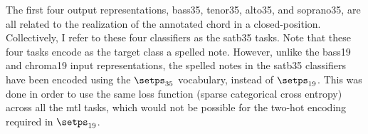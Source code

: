 The first four output representations, \gls{bass35},
\gls{tenor35}, \gls{alto35}, and \gls{soprano35}, are all
related to the realization of the annotated chord in a
\gls{closed-position}. Collectively, I refer to these four
classifiers as the \gls{satb35} tasks. Note that these four
tasks encode as the target class a spelled note. However,
unlike the \gls{bass19} and \gls{chroma19} input
representations, the spelled notes in the \gls{satb35}
classifiers have been encoded using the $\setps_{35}$
vocabulary, instead of $\setps_{19}$. This was done in order
to use the same loss function (sparse categorical cross
entropy) across all the \gls{mtl} tasks, which would not be
possible for the two-hot encoding required in $\setps_{19}$.
